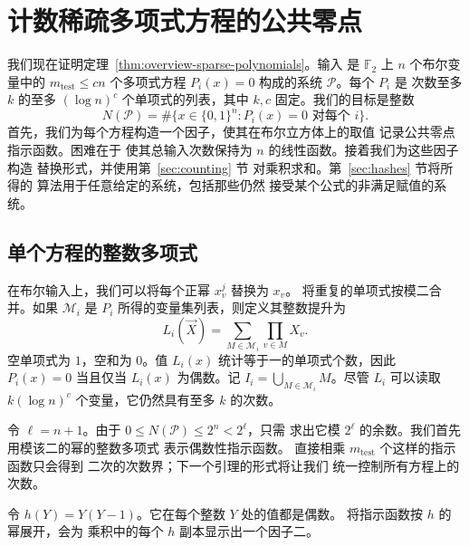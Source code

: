 \documentclass[11pt,reqno]{amsart}
\numberwithin{equation}{section}
\theoremstyle{definition}\newtheorem{definition}[theorem]{定义}
\theoremstyle{remark}\newtheorem{remark}[theorem]{注}
\renewcommand{\le}{\leqslant}
\begin{document}
\section{计数稀疏多项式方程的公共零点}\label{sec:setup}
我们现在证明定理~\ref{thm:overview-sparse-polynomials}。输入
是 $\mathbb F_2$ 上 $n$ 个布尔变量中的 $m_{\mathrm{test}}\le cn$ 个多项式方程
$P_i(x)=0$ 构成的系统 $\mathcal P$。每个 $P_i$ 是
次数至多 $k$ 的至多 $(\log n)^c$ 个单项式的列表，其中 $k,c$ 固定。我们的目标是整数
\begin{equation}\label{eq:common-zero-count}
 N(\mathcal P)=\#\{x\in\{0,1\}^n:P_i(x)=0\text{ 对每个 }i\}.
\end{equation}
首先，我们为每个方程构造一个因子，使其在布尔立方体上的取值
记录公共零点指示函数。困难在于
使其总输入次数保持为 $n$ 的线性函数。接着我们为这些因子构造
替换形式，并使用第~\ref{sec:counting} 节
对乘积求和。第~\ref{sec:hashes} 节将所得的
算法用于任意给定的系统，包括那些仍然
接受某个公式的非满足赋值的系统。

\subsection{单个方程的整数多项式}\label{subsec:rational-lift}
在布尔输入上，我们可以将每个正幂 $x_v^j$ 替换为 $x_v$。
将重复的单项式按模二合并。如果 $\mathcal M_i$ 是
$P_i$ 所得的变量集列表，则定义其整数提升为
\[
 L_i(\vec X)=\sum_{M\in\mathcal M_i}\prod_{v\in M}X_v .
\]
空单项式为 $1$，空和为 $0$。值 $L_i(x)$
统计等于一的单项式个数，因此 $P_i(x)=0$ 当且仅当
$L_i(x)$ 为偶数。记 $I_i=\bigcup_{M\in\mathcal M_i}M$。尽管
$L_i$ 可以读取 $k(\log n)^c$ 个变量，它仍然具有至多 $k$ 的次数。

令 $\ell=n+1$。由于 $0\le N(\mathcal P)\le2^n<2^\ell$，只需
求出它模 $2^\ell$ 的余数。我们首先用模该二的幂的整数多项式
表示偶数性指示函数。
直接相乘 $m_{\mathrm{test}}$ 个这样的指示函数只会得到
二次的次数界；下一个引理的形式将让我们
统一控制所有方程上的次数。

令 $h(Y)=Y(Y-1)$。它在每个整数 $Y$ 处的值都是偶数。
将指示函数按 $h$ 的幂展开，会为
乘积中的每个 $h$ 副本显示出一个因子二。
\end{document}
